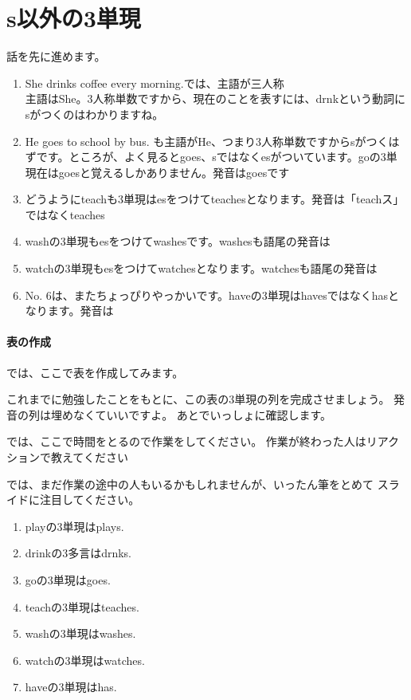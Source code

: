 \documentclass[book,jafontscale=0.9247]{jlreq}
\let\textipa\relax
\newcommand{\mySagyo}{%
\par%
\bigskip
では、ここで時間をとるので作業をしてください。
作業が終わった人はリアクションで教えてください\par%
\begin{minipage}[t]{.98\textwidth}
\mbox{}\hrulefill\mbox{}\par%
\mbox{}\hfill{}\raisebox{-.5\height}{作業}\hfill\mbox{}\par%
\mbox{}\hrulefill\mbox{}
\end{minipage}%
\par%
\bigskip%
では、まだ作業の途中の人もいるかもしれませんが、いったん筆をとめて
スライドに注目してください。%
\par%
\bigskip
}
\begin{document}
\newpage
\section{s以外の3単現}

話を先に進めます。

\begin{enumerate}
 \item She drinks coffee every morning.では、主語が三人称\\
主語はShe。3人称単数ですから、現在のことを表すには、drnkという動詞にsがつくのはわかりますね。
 \item He goes to school by bus. も主語がHe、つまり3人称単数ですからsがつくはずです。ところが、よく見るとgoes、sではなくesがついています。goの3単現在はgoesと覚えるしかありません。発音はgoesです
 \item どうようにteachも3単現はesをつけてteachesとなります。発音は「teachス」ではなくteaches\textipa{/iz/}
 \item washの3単現もesをつけてwashesです。washesも語尾の発音は\textipa{/iz}
 \item watchの3単現もesをつけてwatchesとなります。watchesも語尾の発音は\textipa{/iz}
 \item No. 6は、またちょっぴりやっかいです。haveの3単現はhavesではなくhasとなります。発音は\textipa{/z/}
\end{enumerate}

\paragraph{表の作成}

では、ここで表を作成してみます。

これまでに勉強したことをもとに、この表の3単現の列を完成させましょう。
発音の列は埋めなくていいですよ。
あとでいっしょに確認します。

\mySagyo

\begin{enumerate}
 \item playの3単現はplays.
 \item drinkの3多言はdrnks.
 \item goの3単現はgoes.
 \item teachの3単現はteaches.
 \item washの3単現はwashes.
 \item watchの3単現はwatches.
 \item haveの3単現はhas.
\end{enumerate}
\end{document}
